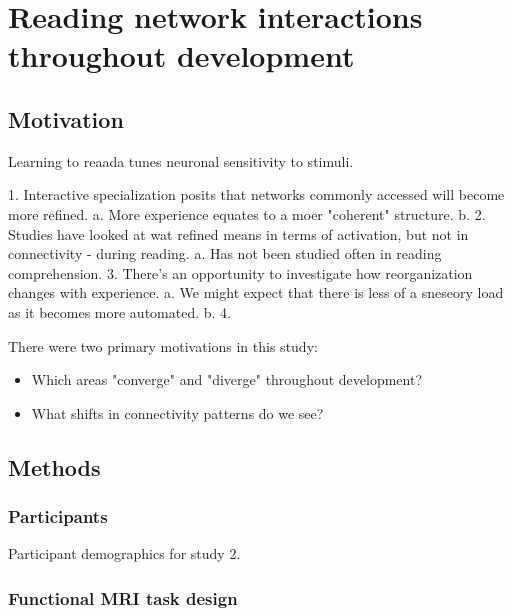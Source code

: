 \chapter{Reading network interactions throughout development}

\epigraph{}{}

\section{Motivation}

Learning to reaada tunes neuronal sensitivity to stimuli. 

1. Interactive specialization posits that networks commonly accessed will become more refined. 
	a. More experience equates to a moer "coherent" structure. 
	b.
2. Studies have looked at wat refined means in terms of activation, but not in connectivity - during reading.
	a. Has not been studied often in reading comprehension.
3. There's an opportunity to investigate how reorganization changes with experience. 
	a. We might expect that there is less of a sneseory load as it becomes more automated. 
	b. 
4. 

There were two primary motivations in this study:

\begin{itemize}
	\item Which areas "converge" and "diverge" throughout development?
	\item What shifts in connectivity patterns do we see?
\end{itemize} 

\section{Methods}

\subsection{Participants}

\begin{table}
	\renewcommand{\tabcolsep}{0.09cm}
	\centering
	
	\caption{Participant demographics for study 2.}
	\label{table:ch3-participants}
\end{table}

\subsection{Functional MRI task design}


